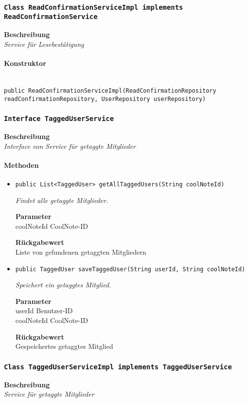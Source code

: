     \subsubsection{\texttt{Class ReadConfirmationServiceImpl implements ReadConfirmationService}}
    \textbf{Beschreibung} \\
    \textit{Service für Lesebestätigung}
    \paragraph*{Konstruktor}\mbox{} \\
    \texttt{public ReadConfirmationServiceImpl(ReadConfirmationRepository readConfirmationRepository, UserRepository userRepository)} \\
    \subsubsection{\texttt{Interface TaggedUserService}}
    \textbf{Beschreibung} \\
    \textit{Interface von Service für getaggte Mitglieder}
    \paragraph*{Methoden}
    \begin{itemize}
    	\item{\texttt{public List<TaggedUser> getAllTaggedUsers(String coolNoteId)}}
    	
    	\textit{Findet alle getaggte Mitglieder.}
    	
    	\textbf{Parameter} \\
    	coolNoteId CoolNote-ID
    	
    	\textbf{Rückgabewert} \\
    	Liste von gefundenen getaggten Mitgliedern        \item{\texttt{public TaggedUser saveTaggedUser(String userId, String coolNoteId)}}
    	
    	\textit{Speichert ein getaggtes Mitglied.}
    	
    	\textbf{Parameter} \\
    	userId Benutzer-ID\\
    	coolNoteId CoolNote-ID
    	
    	\textbf{Rückgabewert} \\
    	Gespeichertes getaggtes Mitglied
    \end{itemize}
    \subsubsection{\texttt{Class TaggedUserServiceImpl implements TaggedUserService}}
    \textbf{Beschreibung} \\
    \textit{Service für getaggte Mitglieder}
